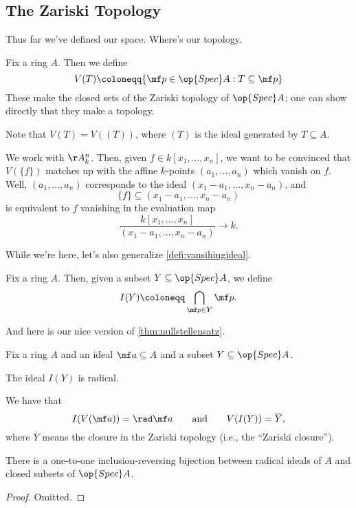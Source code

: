 \documentclass[../notes.tex]{subfiles}
\begin{document}
\subsection{The Zariski Topology}
Thus far we've defined our space. Where's our topology.
\begin{definition} \label{defi:zariski}
	Fix a ring $A$. Then we define
	\[V(T)\coloneqq\{\mf p\in\op{Spec}A:T\subseteq\mf p\}\]
	These make the closed sets of the Zariski topology of $\op{Spec}A$; one can show directly that they make a topology.
\end{definition}
\begin{remark}
	Note that $V(T)=V((T))$, where $(T)$ is the ideal generated by $T\subseteq A$.
\end{remark}
\begin{example}
	We work with $\AA^n_k$. Then, given $f\in k[x_1,\ldots,x_n]$, we want to be convinced that $V(\{f\})$ matches up with the affine $k$-points $(a_1,\ldots,a_n)$ which vanish on $f$. Well, $(a_1,\ldots,a_n)$ corresponds to the ideal $(x_1-a_1,\ldots,x_n-a_n)$, and
	\[\{f\}\subseteq(x_1-a_1,\ldots,x_n-a_n)\]
	is equivalent to $f$ vanishing in the evaluation map
	\[\frac{k[x_1,\ldots,x_n]}{(x_1-a_1,\ldots,x_n-a_n)}\to k.\]
\end{example}
While we're here, let's also generalize \autoref{defi:vansihingideal}.
\begin{definition}
	Fix a ring $A$. Then, given a subset $Y\subseteq\op{Spec}A$, we define
	\[I(Y)\coloneqq\bigcap_{\mf p\in Y}\mf p.\]
\end{definition}
And here is our nice version of \autoref{thm:nullstellensatz}.
\begin{proposition}
	Fix a ring $A$ and an ideal $\mf a\subseteq A$ and a subset $Y\subseteq\op{Spec}A$.
	\begin{listalph}
		\item The ideal $I(Y)$ is radical.
		\item We have that
		\[I(V(\mf a))=\rad\mf a\qquad\text{and}\qquad V(I(Y))=\overline Y,\]
		where $\overline Y$ means the closure in the Zariski topology (i.e., the ``Zariski closure'').
		\item There is a one-to-one inclusion-reversing bijection between radical ideals of $A$ and closed subsets of $\op{Spec}A$.
	\end{listalph}
\end{proposition}
\begin{proof}
	Omitted.
\end{proof}
\end{document}
